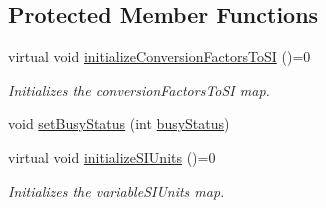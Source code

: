 \subsection*{Protected Member Functions}
\begin{DoxyCompactItemize}
\item 
virtual void \hyperlink{classccmc_1_1_model_a6f04326691fba448e2cfb7c7ab90a45a}{initialize\-Conversion\-Factors\-To\-S\-I} ()=0
\begin{DoxyCompactList}\small\item\em Initializes the conversion\-Factors\-To\-S\-I map. \end{DoxyCompactList}\item 
void \hyperlink{classccmc_1_1_model_ad4afaf8f5cb1b8bb73034658145b4934}{set\-Busy\-Status} (int \hyperlink{classccmc_1_1_model_acee07d9abc8cb8c0bc3fbaeb879cc251}{busy\-Status})
\item 
virtual void \hyperlink{classccmc_1_1_model_a68d31e8d8cce59269c994de25d048178}{initialize\-S\-I\-Units} ()=0
\begin{DoxyCompactList}\small\item\em Initializes the variable\-S\-I\-Units map. \end{DoxyCompactList}\end{DoxyCompactItemize}
